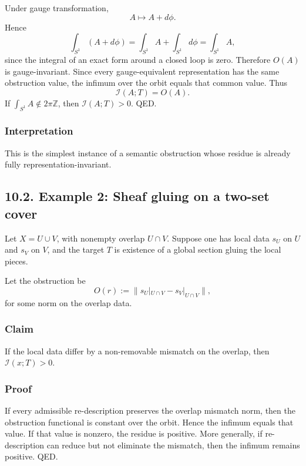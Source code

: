 \documentclass[
]{article}
\begin{document}
Under gauge transformation, \[
A \mapsto A + d\phi.
\] Hence \[
\int_{S^1} (A + d\phi) = \int_{S^1} A + \int_{S^1} d\phi = \int_{S^1} A,
\] since the integral of an exact form around a closed loop is zero.
Therefore \(O(A)\) is gauge-invariant. Since every gauge-equivalent
representation has the same obstruction value, the infimum over the
orbit equals that common value. Thus \[
\mathcal{I}(A;T) = O(A).
\] If \(\int_{S^1} A \notin 2\pi \mathbb{Z}\), then
\(\mathcal{I}(A;T) > 0\). QED.

\subsubsection{Interpretation}\label{interpretation-3}

This is the simplest instance of a semantic obstruction whose residue is
already fully representation-invariant.

\subsection{10.2. Example 2: Sheaf gluing on a two-set
cover}\label{example-2-sheaf-gluing-on-a-two-set-cover}

Let \(X = U \cup V\), with nonempty overlap \(U \cap V\). Suppose one
has local data \(s_U\) on \(U\) and \(s_V\) on \(V\), and the target
\(T\) is existence of a global section gluing the local pieces.

Let the obstruction be \[
O(r) := \| s_U|_{U \cap V} - s_V|_{U \cap V} \|,
\] for some norm on the overlap data.

\subsubsection{Claim}\label{claim-1}

If the local data differ by a non-removable mismatch on the overlap,
then \(\mathcal{I}(x;T) > 0\).

\subsubsection{Proof}\label{proof-8}

If every admissible re-description preserves the overlap mismatch norm,
then the obstruction functional is constant over the orbit. Hence the
infimum equals that value. If that value is nonzero, the residue is
positive. More generally, if re-description can reduce but not eliminate
the mismatch, then the infimum remains positive. QED.
\end{document}
